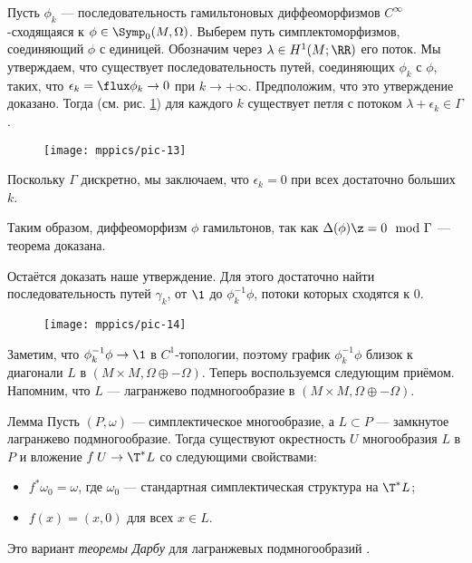 Пусть $\phi_k$ — последовательность гамильтоновых диффеоморфизмов $C^\infty$-сходящаяся к $\phi\in\Symp_0(M,\Omega)$.
Выберем путь симплектоморфизмов, соединяющий $\phi$ с единицей.
Обозначим через $\lambda \in H^1 (M;\RR)$ его поток.
Мы утверждаем, что существует последовательность путей, соединяющих $\phi_k$ с $\phi$, 
таких, что $\epsilon_k=\flux \phi_k\to 0$ при $k\to +\infty$.
Предположим, что это утверждение доказано.
Тогда (см. рис. \ref{pic-13}) для каждого $k$ существует петля с потоком $\lambda + \epsilon_k\in \Gamma$.
\begin{figure}[ht!]
\centering
\texttt{[image: mppics/pic-13]}
\caption{}\label{pic-13}
\vskip0mm
\end{figure}
Поскольку $\Gamma$ дискретно, мы заключаем, что $\epsilon_k=0$ при всех достаточно больших $k$.



Таким образом, диффеоморфизм $\phi$ гамильтонов, так как $\Delta(\phi) \z= 0 \mod{\Gamma}$  — теорема доказана.

Остаётся доказать наше утверждение.
Для этого достаточно найти последовательность путей $\gamma_k$, от
$\1$ до $\phi_k^{-1}\phi$, потоки которых сходятся к $0$.

\begin{figure}[ht!]
\centering
\texttt{[image: mppics/pic-14]}
\caption{}\label{pic-14}
\vskip0mm
\end{figure}

Заметим, что $\phi_k^{-1}\phi \to \1$ в $C^{1}$-топологии, поэтому график
$\phi_k^{-1}\phi$ близок к диагонали $L$ в $(M \times M, \Omega \oplus
-\Omega)$. 
Теперь воспользуемся следующим приёмом.
Напомним, что $L$ — лагранжево подмногообразие в $(M \times M,
\Omega \oplus -\Omega)$.

\begin{thm}{Лемма}
Пусть $(P, \omega)$ — симплектическое многообразие, а $L\subset P$
— замкнутое лагранжево подмногообразие. 
Тогда существуют окрестность $U$ многообразия $L$ в $P$ и вложение
$f\: U \to \T^\ast L$ со следующими свойствами: 
\begin{itemize}
\item $f^\ast\omega_0 = \omega$, где $\omega_0$ — стандартная симплектическая структура на $\T^\ast L$;
\item $f(x) = (x,0)$ для всех $x\in L$.
\end{itemize}
\end{thm}
Это вариант \emph{теоремы Дарбу} для лагранжевых
подмногообразий \cite{MS}. 

